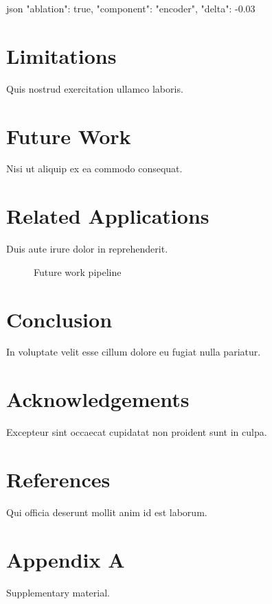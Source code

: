 \documentclass[code=listings]{SUSTechHomework}
\begin{document}
\begin{sustechcode}{json}
{
  "ablation": true,
  "component": "encoder",
  "delta": -0.03
}
\end{sustechcode}

\section{Limitations}
Quis nostrud exercitation ullamco laboris.

\section{Future Work}
Nisi ut aliquip ex ea commodo consequat.

\section{Related Applications}
Duis aute irure dolor in reprehenderit.

\begin{figure}[htbp]
  \centering
  \begin{sustechpipelinediagram}
  \end{sustechpipelinediagram}
  \caption{Future work pipeline}
\end{figure}

\section{Conclusion}
In voluptate velit esse cillum dolore eu fugiat nulla pariatur.

\section{Acknowledgements}
Excepteur sint occaecat cupidatat non proident sunt in culpa.

\section{References}
Qui officia deserunt mollit anim id est laborum.

\section{Appendix A}
Supplementary material.
\end{document}
